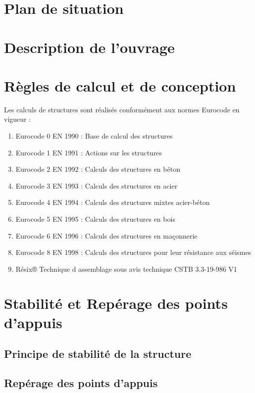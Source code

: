 \documentclass{rSIMONIN} %
\begin{document}
\section{Plan de situation}

\section{Description de l'ouvrage}

\section{Règles de calcul et de conception}

Les calculs de structures sont réalisés conformément aux normes Eurocode en vigueur :
\begin{enumerate}
    \item Eurocode 0 EN 1990 : Base de calcul des structures
    \item Eurocode 1 EN 1991 : Actions sur les structures
    \item Eurocode 2 EN 1992 : Calculs des structures en béton
    \item Eurocode 3 EN 1993 : Calculs des structures en acier
    \item Eurocode 4 EN 1994 : Calculs des structures mixtes acier-béton
    \item Eurocode 5 EN 1995 : Calculs des structures en bois
    \item Eurocode 6 EN 1996 : Calculs des structures en maçonnerie
    \item Eurocode 8 EN 1998 : Calculs des structures pour leur résistance aux séismes
    \item Résix® Technique d assemblage sous avis technique CSTB 3.3-19-986 V1
\end{enumerate}




\section{Stabilité et Repérage des points d'appuis}
\subsection{Principe de stabilité de la structure}

\subsection{Repérage des points d'appuis}
\end{document}
